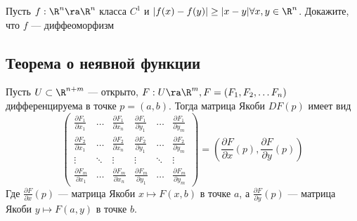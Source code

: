 \begin{problem}
    Пусть \(f: \R^n \ra \R^n\) класса \(C^1\) и \(|f(x) - f(y)| \ge |x - y| \forall x, y \in \R^n\). Докажите, что \(f\) --- диффеоморфизм
\end{problem}


\subsection{Теорема о неявной функции}
Пусть \(U \subset \R^{n + m}\) --- открыто, \(F: U \ra \R^m, F = (F_1, F_2, \dots F_n)\) дифференцируема в точке \(p = (a, b)\). Тогда матрица Якоби \(DF(p)\) имеет вид
\[\left( \begin{array}{cccccc}
    \frac{\partial F_1}{\partial x_1} & \dots & \frac{\partial F_1}{\partial x_n} & \frac{\partial F_1}{\partial y_1} & \dots & \frac{\partial F_1}{\partial y_m} \\
    \frac{\partial F_2}{\partial x_1} & \dots & \frac{\partial F_2}{\partial x_n} & \frac{\partial F_2}{\partial y_1} & \dots & \frac{\partial F_2}{\partial y_m} \\
    \vdots & \ddots & \vdots & \vdots & \ddots & \vdots \\
    \frac{\partial F_m}{\partial x_1} & \dots & \frac{\partial F_m}{\partial x_n} & \frac{\partial F_m}{\partial y_1} & \dots & \frac{\partial F_m}{\partial y_m}
\end{array} \right) = \left( \frac{\partial F}{\partial x}(p), \frac{\partial F}{\partial y}(p) \right)\]
Где \( \frac{\partial F}{\partial x}(p)\) --- матрица Якоби \(x \mapsto F(x, b)\) в точке \(a\), а \( \frac{\partial F}{\partial y}(p)\) --- матрица Якоби \(y \mapsto F(a, y)\) в точке \(b\).

